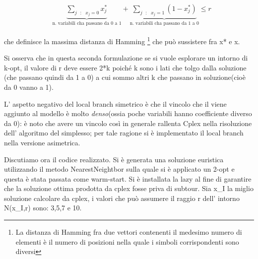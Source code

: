 \documentclass[11pt]{article}
\begin{document}
\begin{eqnarray}
&\displaystyle\underbrace{\sum_{j\text{ } : \text{ } x_j = 0} x_j^{*}}_{\text{n. variabili cha passano da 0 a 1}} + \underbrace{\sum_{j\text{ }:\text{ } x_j = 1}(1 - x_j^{*})}_{\text{n. variabili cha passano da 1 a 0}} \le r
\end{eqnarray}

che definisce la massima distanza di Hamming \footnote{La distanza di Hamming fra due vettori contenenti il medesimo numero di elementi è il numero di posizioni nella quale i simboli corrispondenti sono diversi} che può sussistere fra x* e x. 

Si osserva che in questa seconda formulazione se si vuole esplorare un intorno di k-opt, il valore di r deve essere 2*k poiché k sono i lati che tolgo dalla soluzione (che passano quindi da 1 a 0) a cui sommo altri k che passano in soluzione(cioè da 0 vanno a 1). 


L' aspetto negativo del local branch simetrico è che il vincolo che il viene aggiunto al modello è molto \emph{denso}(ossia poche variabili hanno coefficiente diverso da 0): è noto che avere un vincolo così in generale rallenta Cplex nella risoluzione dell' algoritmo del simplesso; per tale ragione si è implementato il local branch nella versione asimetrica.

Discutiamo ora il codice realizzato. Si è generata una soluzione euristica utilizzando il metodo NearestNeightbor sulla quale si è applicato un 2-opt e questa è stata passata come warm-start. Si è installata la lazy al fine di garantire che la soluzione ottima prodotta da cplex fosse priva di subtour. Sia x_I la miglio soluzione calcolare da cplex, i valori che può assumere il raggio r dell' intorno N(x_I,r) sono: 3,5,7 e 10.
\end{document}
